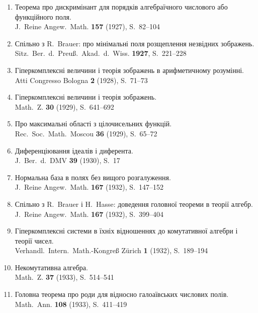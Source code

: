 \documentclass[11pt]{article}
\newcommand{\foreign}[1]{#1}
\begin{document}
\begin{enumerate}[label={\small\arabic*.},leftmargin=2em,itemsep=0.3em]
\item Теорема про дискримінант для порядків алгебраїчного числового або функційного поля.\\
\foreign{J.\ Reine Angew.\ Math.} \textbf{157} (1927), S.~82--104

\item Спільно з R.\ Brauer: про мінімальні поля розщеплення незвідних зображень.\\
\foreign{Sitz.\ Ber.\ d.\ Preuß.\ Akad.\ d.\ Wiss.} \textbf{1927}, S.~221--228

\item Гіперкомплексні величини і теорія зображень в арифметичному розумінні.\\
\foreign{Atti Congresso Bologna} \textbf{2} (1928), S.~71--73

\item Гіперкомплексні величини і теорія зображень.\\
\foreign{Math.\ Z.} \textbf{30} (1929), S.~641--692

\item Про максимальні області з цілочисельних функцій.\\
\foreign{Rec.\ Soc.\ Math.\ Moscou} \textbf{36} (1929), S.~65--72

\item Диференціювання ідеалів і диферента.\\
\foreign{J.\ Ber.\ d.\ DMV} \textbf{39} (1930), S.~17

\item Нормальна база в полях без вищого розгалуження.\\
\foreign{J.\ Reine Angew.\ Math.} \textbf{167} (1932), S.~147--152

\item Спільно з R.\ Brauer і H.\ Hasse: доведення головної теореми в теорії алгебр.\\
\foreign{J.\ Reine Angew.\ Math.} \textbf{167} (1932), S.~399--404

\item Гіперкомплексні системи в їхніх відношеннях до комутативної алгебри і теорії чисел.\\
\foreign{Verhandl.\ Intern.\ Math.-Kongreß Zürich} \textbf{1} (1932), S.~189--194

\item Некомутативна алгебра.\\
\foreign{Math.\ Z.} \textbf{37} (1933), S.~514--541

\item Головна теорема про роди для відносно галоаївських числових полів.\\
\foreign{Math.\ Ann.} \textbf{108} (1933), S.~411--419


\end{enumerate}
\end{document}
